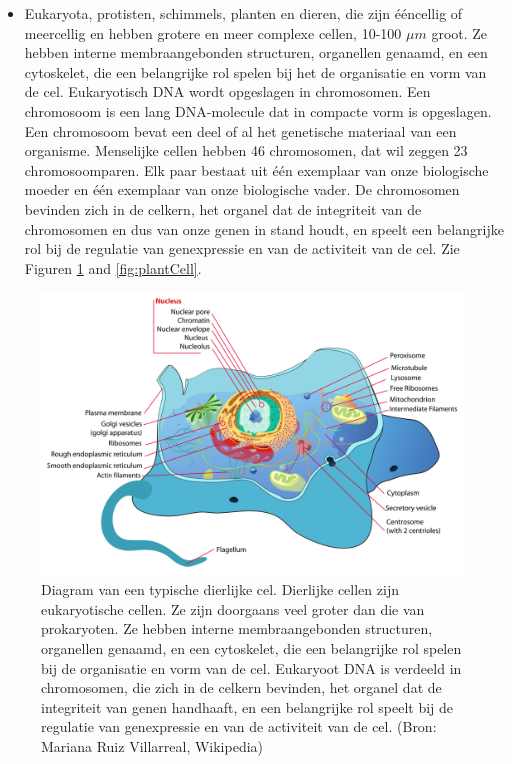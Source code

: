 \documentclass[
  11pt,
]{book}
\providecommand{\tightlist}{%
  \setlength{\itemsep}{0pt}\setlength{\parskip}{0pt}}
\begin{document}
\begin{itemize}
\tightlist
\item
  Eukaryota, protisten, schimmels, planten en dieren, die zijn ééncellig of meercellig en hebben grotere en meer complexe cellen, 10-100 \(\mu m\) groot. Ze hebben interne membraangebonden structuren, organellen genaamd, en een cytoskelet, die een belangrijke rol spelen bij het de organisatie en vorm van de cel. Eukaryotisch DNA wordt opgeslagen in chromosomen. Een chromosoom is een lang DNA-molecule dat in compacte vorm is opgeslagen. Een chromosoom bevat een deel of al het genetische materiaal van een organisme. Menselijke cellen hebben 46 chromosomen, dat wil zeggen 23 chromosoomparen. Elk paar bestaat uit één exemplaar van onze biologische moeder en één exemplaar van onze biologische vader. De chromosomen bevinden zich in de celkern, het organel dat de integriteit van de chromosomen en dus van onze genen in stand houdt, en speelt een belangrijke rol bij de regulatie van genexpressie en van de activiteit van de cel. Zie Figuren \ref{fig:animalCell} and \ref{fig:plantCell}.
\end{itemize}

\begin{figure}

{\centering \includegraphics[width=0.5\linewidth]{./figs/animalCell} 

}

\caption{Diagram van een typische dierlijke cel. Dierlijke cellen zijn eukaryotische cellen. Ze zijn doorgaans veel groter dan die van prokaryoten. Ze hebben interne membraangebonden structuren, organellen genaamd, en een cytoskelet, die een belangrijke rol spelen bij de organisatie en vorm van de cel. Eukaryoot DNA is verdeeld in chromosomen, die zich in de celkern bevinden, het organel dat de integriteit van genen handhaaft, en een belangrijke rol speelt bij de regulatie van genexpressie en van de activiteit van de cel. (Bron:  Mariana Ruiz Villarreal, Wikipedia)}\label{fig:animalCell}
\end{figure}
\end{document}

